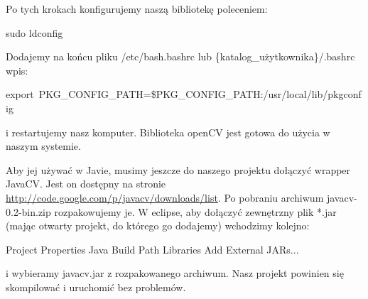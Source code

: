 \documentclass[a4paper, twoside]{article}
\begin{document}
Po tych krokach konfigurujemy naszą bibliotekę poleceniem:

\begin{center}sudo ldconfig\end{center}

Dodajemy na końcu pliku /etc/bash.bashrc lub \{katalog\_użytkownika\}/.bashrc wpis:
\begin{center}\mbox{export PKG\_CONFIG\_PATH=\$PKG\_CONFIG\_PATH:/usr/local/lib/pkgconfig} \end{center}

i restartujemy nasz komputer. Biblioteka openCV jest gotowa do użycia w naszym systemie.

Aby jej używać w Javie, musimy jeszcze do naszego projektu dołączyć wrapper JavaCV. Jest on dostępny na stronie \href{http://code.google.com/p/javacv/downloads/list}{http://code.google.com/p/javacv/downloads/list}. Po pobraniu archiwum javacv-0.2-bin.zip rozpakowujemy je. W eclipse, aby dołączyć zewnętrzny plik *.jar (mając otwarty projekt, do którego go dodajemy) wchodzimy kolejno:
\begin{center} Project \rightarrow Properties \rightarrow Java Build Path \rightarrow Libraries \rightarrow Add External JARs...\end{center}
\newline
\newline
i wybieramy javacv.jar z rozpakowanego archiwum. Nasz projekt powinien się skompilować i uruchomić bez problemów.
\end{document}
